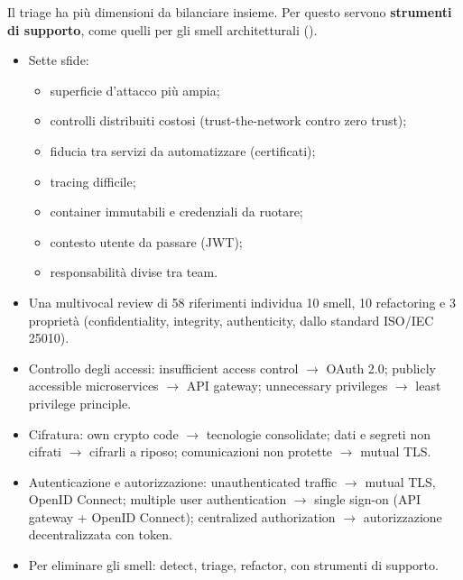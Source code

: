 Il triage ha più dimensioni da bilanciare insieme. Per questo servono \textbf{strumenti di supporto}, come quelli per
gli smell architetturali ().

\begin{puntichiave}
\begin{itemize}
  \item Sette sfide:
    \begin{itemize}
      \item superficie d'attacco più ampia;
      \item controlli distribuiti costosi (trust-the-network contro zero trust);
      \item fiducia tra servizi da automatizzare (certificati);
      \item tracing difficile;
      \item container immutabili e credenziali da ruotare;
      \item contesto utente da passare (JWT);
      \item responsabilità divise tra team.
    \end{itemize}
  \item Una multivocal review di 58 riferimenti individua 10 smell, 10 refactoring e 3 proprietà (confidentiality,
    integrity, authenticity, dallo standard ISO/IEC 25010).
  \item Controllo degli accessi: insufficient access control $\to$ OAuth 2.0; publicly accessible microservices $\to$
    API gateway; unnecessary privileges $\to$ least privilege principle.
  \item Cifratura: own crypto code $\to$ tecnologie consolidate; dati e segreti non cifrati $\to$ cifrarli a riposo;
    comunicazioni non protette $\to$ mutual TLS.
  \item Autenticazione e autorizzazione: unauthenticated traffic $\to$ mutual TLS, OpenID Connect; multiple user
    authentication $\to$ single sign-on (API gateway + OpenID Connect); centralized authorization $\to$ autorizzazione
    decentralizzata con token.
  \item Per eliminare gli smell: detect, triage, refactor, con strumenti di supporto.
\end{itemize}
\end{puntichiave}

